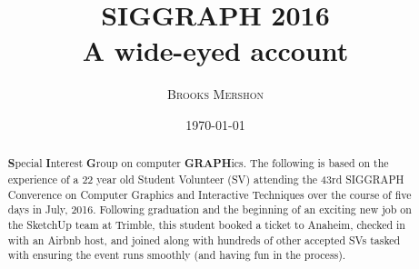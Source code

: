 \documentclass[a4paper, 11pt]{article} %
\title{\textbf{SIGGRAPH 2016}\\ %
A wide-eyed account} %
\author{\textsc{Brooks Mershon}} %
\date{\today} %
\begin{document}
\maketitle %

\eject


\renewcommand{\abstractname}{Forward} %

\begin{abstract}
	\textbf{S}pecial \textbf{I}nterest \textbf{G}roup on computer \textbf{GRAPH}ics. The following is based on the experience of a 22 year old Student Volunteer (SV) attending the 43rd SIGGRAPH Converence on Computer Graphics and Interactive Techniques over the course of five days in July, 2016. Following graduation and the beginning of an exciting new job on the SketchUp team at Trimble, this student booked a ticket to Anaheim, checked in with an Airbnb host, and joined along with hundreds of other accepted SVs tasked with ensuring the event runs smoothly (and having fun in the process).
\end{abstract}

\eject

\tableofcontents

\eject





%


%

\end{document}
